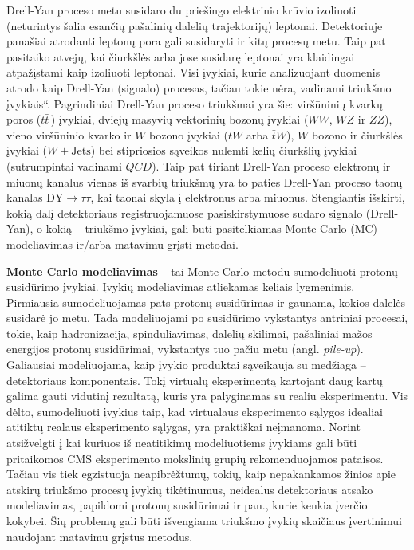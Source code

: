 \documentclass[a4paper, 12pt, oneside]{article}
\newcommand{\WJets}{W\! +\!\mathrm{Jets}}
\newcommand{\DYtau}{\mathrm{DY} \! \rightarrow \! \tau\tau}
\newcommand{\ltq}[1]{{\quotedblbase{}#1\textquotedblleft{}}}
\newcommand{\QCD}{QC\! D}
\newlength\q
\begin{document}
Drell-Yan proceso metu susidaro du priešingo elektrinio krūvio izoliuoti (neturintys šalia esančių pašalinių dalelių trajektorijų) leptonai.
Detektoriuje panašiai atrodanti leptonų pora gali susidaryti ir kitų procesų metu.
Taip pat pasitaiko atvejų, kai čiurkšlės arba jose susidarę leptonai yra klaidingai atpažįstami kaip izoliuoti leptonai.
Visi įvykiai, kurie analizuojant duomenis atrodo kaip Drell-Yan (signalo) procesas, tačiau tokie nėra, vadinami
\ltq{triukšmo įvykiais}.
Pagrindiniai Drell-Yan proceso triukšmai yra šie: viršūninių kvarkų poros ($t\bar{t}\,$) įvykiai, dviejų masyvių vektorinių bozonų
įvykiai ($WW$, $WZ$ ir $ZZ$), vieno viršūninio kvarko ir $W$ bozono įvykiai ($tW$ arba $\bar{t}W$), $W$ bozono
ir čiurkšlės įvykiai ($\WJets$) bei stipriosios sąveikos nulemti kelių čiurkšlių įvykiai (sutrumpintai vadinami $\QCD$).
Taip pat tiriant Drell-Yan proceso elektronų ir miuonų kanalus vienas iš svarbių triukšmų yra
to paties Drell-Yan proceso taonų kanalas $\DYtau$, kai taonai skyla į elektronus arba miuonus.
Stengiantis išskirti, kokią dalį detektoriaus registruojamuose pasiskirstymuose sudaro signalo (Drell-Yan),
o kokią -- triukšmo įvykiai, gali būti pasitelkiamas Monte Carlo (MC) modeliavimas ir/arba matavimu grįsti metodai.

\textbf{Monte Carlo modeliavimas} -- tai Monte Carlo metodu sumodeliuoti protonų susidūrimo įvykiai.
Įvykių modeliavimas atliekamas keliais lygmenimis.
Pirmiausia sumodeliuojamas pats protonų susidūrimas ir gaunama, kokios dalelės susidarė jo metu.
Tada modeliuojami po susidūrimo vykstantys antriniai procesai, tokie, kaip hadronizacija, spinduliavimas, dalelių skilimai,
pašaliniai mažos energijos protonų susidūrimai, vykstantys tuo pačiu metu (angl. \textit{pile-up}).
Galiausiai modeliuojama, kaip įvykio produktai sąveikauja su medžiaga -- detektoriaus komponentais.
Tokį virtualų eksperimentą kartojant daug kartų galima gauti vidutinį rezultatą, kuris yra palyginamas su realiu eksperimentu.
Vis dėlto, sumodeliuoti įvykius taip, kad virtualaus eksperimento sąlygos idealiai atitiktų realaus eksperimento sąlygas,
yra praktiškai neįmanoma.
Norint atsižvelgti į kai kuriuos iš neatitikimų modeliuotiems įvykiams gali būti pritaikomos CMS eksperimento mokslinių grupių
rekomenduojamos pataisos.
Tačiau vis tiek egzistuoja neapibrėžtumų, tokių, kaip nepakankamos žinios apie atskirų triukšmo procesų įvykių tikėtinumus,
neidealus detektoriaus atsako modeliavimas, papildomi protonų susidūrimai ir pan., kurie kenkia įverčio kokybei.
Šių problemų gali būti išvengiama triukšmo įvykių skaičiaus įvertinimui naudojant matavimu grįstus metodus.
\end{document}
